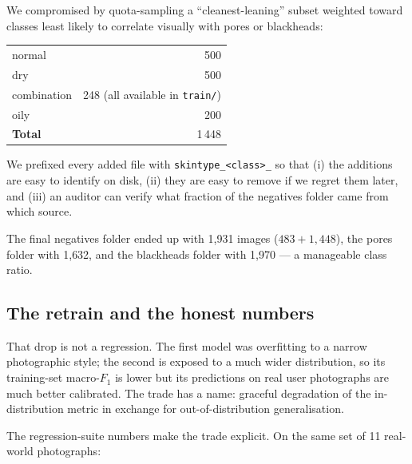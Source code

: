 \documentclass[11pt,a4paper,oneside]{report}
\begin{document}
We compromised by quota-sampling a ``cleanest-leaning'' subset
weighted toward classes least likely to correlate visually with
pores or blackheads:

\begin{center}
\begin{tabular}{lr}
\toprule
normal      & 500 \\
dry         & 500 \\
combination & 248 (all available in \texttt{train/}) \\
oily        & 200 \\
\midrule
\textbf{Total} & 1\,448 \\
\bottomrule
\end{tabular}
\end{center}

We prefixed every added file with \texttt{skintype\_<class>\_} so
that (i) the additions are easy to identify on disk, (ii) they are
easy to remove if we regret them later, and (iii) an auditor can
verify what fraction of the negatives folder came from
which source.

The final negatives folder ended up with 1{,}931 images
(\(483 + 1{,}448\)), the pores folder with 1{,}632, and the
blackheads folder with 1{,}970 --- a manageable class ratio.

\subsection{The retrain and the honest numbers}

That drop is not a regression. The first model was overfitting to
a narrow photographic style; the second is exposed to a much
wider distribution, so its training-set macro-\(F_1\) is lower but
its predictions on real user photographs are much better
calibrated. The trade has a name: graceful degradation of the
in-distribution metric in exchange for out-of-distribution
generalisation.

The regression-suite numbers make the trade explicit. On the same
set of 11 real-world photographs:
\end{document}
